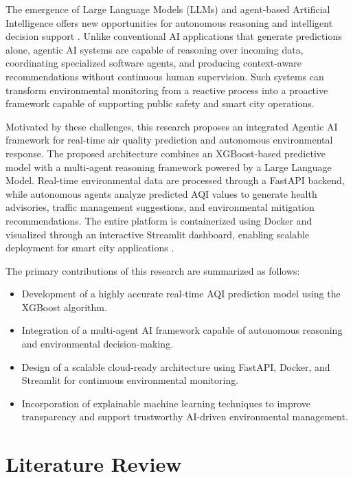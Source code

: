 \documentclass[conference]{IEEEtran}
\begin{document}
The emergence of Large Language Models (LLMs) and agent-based Artificial Intelligence offers new opportunities for autonomous reasoning and intelligent decision support \cite{b3,b4,b16,b17}. Unlike conventional AI applications that generate predictions alone, agentic AI systems are capable of reasoning over incoming data, coordinating specialized software agents, and producing context-aware recommendations without continuous human supervision. Such systems can transform environmental monitoring from a reactive process into a proactive framework capable of supporting public safety and smart city operations.

Motivated by these challenges, this research proposes an integrated Agentic AI framework for real-time air quality prediction and autonomous environmental response. The proposed architecture combines an XGBoost-based predictive model with a multi-agent reasoning framework powered by a Large Language Model. Real-time environmental data are processed through a FastAPI backend, while autonomous agents analyze predicted AQI values to generate health advisories, traffic management suggestions, and environmental mitigation recommendations. The entire platform is containerized using Docker and visualized through an interactive Streamlit dashboard, enabling scalable deployment for smart city applications  \cite{b16,b17,b25}.

The primary contributions of this research are summarized as follows:

\begin{itemize}
    \item Development of a highly accurate real-time AQI prediction model using the XGBoost algorithm.
    \item Integration of a multi-agent AI framework capable of autonomous reasoning and environmental decision-making.
    \item Design of a scalable cloud-ready architecture using FastAPI, Docker, and Streamlit for continuous environmental monitoring.
    \item Incorporation of explainable machine learning techniques to improve transparency and support trustworthy AI-driven environmental management.
\end{itemize}

\section{Literature Review}
\end{document}
